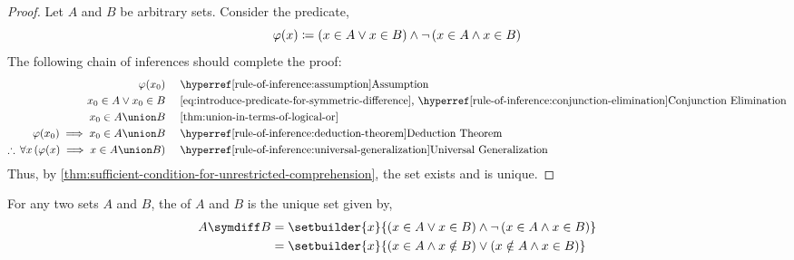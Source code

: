 \begin{proof}
    Let \( A \) and \( B \) be arbitrary sets. Consider the predicate,
    \begin{equation}
        \label{eq:introduce-predicate-for-symmetric-difference}
        \varphi(x) \coloneq \mleft( x \in A \lor x \in B \mright)
        \land
        \lnot \, \mleft( x \in A \land x \in B \mright)
    \end{equation}
    The following chain of inferences should complete the proof:
    \begin{equation*}
        \begin{aligned}
            \varphi(x_{0})& \\
            x_{0} \in A \lor x_{0} \in B& \\
            x_{0} \in A \union B& \\
            \varphi(x_{0}) \implies x_{0} \in A \union B& \\
            \therefore \, \forall x \, \mleft( \varphi(x) \implies
            x \in A \union B \mright)&
        \end{aligned}
        \text{  }
        \begin{aligned}
            &\quad\text{\aref{rule-of-inference:assumption}{Assumption}}\\
            &\quad\text{\eqref{eq:introduce-predicate-for-symmetric-difference},
            \aref{rule-of-inference:conjunction-elimination}{Conjunction Elimination}}\\
            &\quad\text{\cref{thm:union-in-terms-of-logical-or}}\\
            &\quad\text{\aref{rule-of-inference:deduction-theorem}{Deduction Theorem}}\\
            &\quad\text{\aref{rule-of-inference:universal-generalization}{Universal Generalization}}
        \end{aligned}
    \end{equation*}
    Thus, by \cref{thm:sufficient-condition-for-unrestricted-comprehension},
    the set  exists and is unique.
\end{proof}

\begin{dfn}
    \label{dfn:symmetric-difference}
    For any two sets \( A \) and \( B \), the 
    of \( A \) and \( B \) is the unique set given by,
    \begin{align*}
        A \symdiff B &= \setbuilder{x}{ \mleft( x \in A \lor x \in B \mright) \land
        \lnot \, \mleft( x \in A \land x \in B \mright) } \\
        &=
        \setbuilder{x}{\mleft( x \in A \land x \notin B \mright) \lor \mleft( x \notin A \land x \in B \mright)}
    \end{align*}
\end{dfn}

